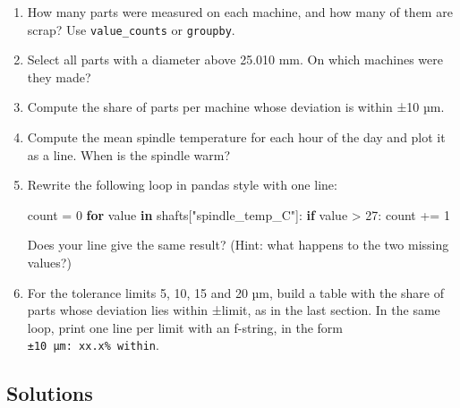 \documentclass[
  letterpaper,
  DIV=11,
  numbers=noendperiod]{scrreprt}
\newenvironment{Shaded}{\begin{snugshade}}{\end{snugshade}}
\newcommand{\ControlFlowTok}[1]{\textcolor[rgb]{0.00,0.23,0.31}{\textbf{#1}}}
\newcommand{\DecValTok}[1]{\textcolor[rgb]{0.68,0.00,0.00}{#1}}
\newcommand{\KeywordTok}[1]{\textcolor[rgb]{0.00,0.23,0.31}{\textbf{#1}}}
\newcommand{\NormalTok}[1]{\textcolor[rgb]{0.00,0.23,0.31}{#1}}
\newcommand{\OperatorTok}[1]{\textcolor[rgb]{0.37,0.37,0.37}{#1}}
\newcommand{\StringTok}[1]{\textcolor[rgb]{0.13,0.47,0.30}{#1}}
\begin{document}
\begin{enumerate}
\def\labelenumi{\arabic{enumi}.}
\item
  How many parts were measured on each machine, and how many of them are
  scrap? Use \texttt{value\_counts} or \texttt{groupby}.
\item
  Select all parts with a diameter above 25.010 mm. On which machines
  were they made?
\item
  Compute the share of parts per machine whose deviation is within ±10
  µm.
\item
  Compute the mean spindle temperature for each hour of the day and plot
  it as a line. When is the spindle warm?
\item
  Rewrite the following loop in pandas style with one line:

\begin{Shaded}
\begin{Highlighting}[]
\NormalTok{count }\OperatorTok{=} \DecValTok{0}
\ControlFlowTok{for}\NormalTok{ value }\KeywordTok{in}\NormalTok{ shafts[}\StringTok{"spindle\_temp\_C"}\NormalTok{]:}
    \ControlFlowTok{if}\NormalTok{ value }\OperatorTok{\textgreater{}} \DecValTok{27}\NormalTok{:}
\NormalTok{        count }\OperatorTok{+=} \DecValTok{1}
\end{Highlighting}
\end{Shaded}

  Does your line give the same result? (Hint: what happens to the two
  missing values?)
\item
  For the tolerance limits 5, 10, 15 and 20 µm, build a table with the
  share of parts whose deviation lies within ±limit, as in the last
  section. In the same loop, print one line per limit with an f-string,
  in the form \texttt{±10\ µm:\ xx.x\%\ within}.
\end{enumerate}

\subsection*{Solutions}\label{solutions}
\end{document}
